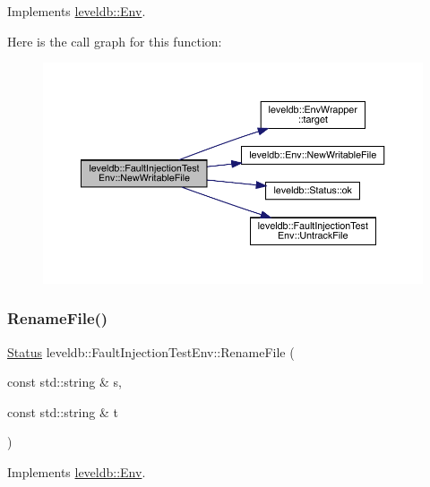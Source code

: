 Implements \mbox{\hyperlink{classleveldb_1_1_env_a4566194f3e82fede425fdb5bb355f7de}{leveldb\+::\+Env}}.

Here is the call graph for this function\+:
\nopagebreak
\begin{figure}[H]
\begin{center}
\leavevmode
\includegraphics[width=350pt]{classleveldb_1_1_fault_injection_test_env_a1e89cf48116748a2f7d8c07022eab4f7_cgraph}
\end{center}
\end{figure}
\mbox{\label{classleveldb_1_1_fault_injection_test_env_ac283e671532ee024cf22f84b95680061}} 
\subsubsection{\texorpdfstring{RenameFile()}{RenameFile()}}
{\footnotesize\ttfamily \mbox{\hyperlink{classleveldb_1_1_status}{Status}} leveldb\+::\+Fault\+Injection\+Test\+Env\+::\+Rename\+File (\begin{DoxyParamCaption}\item[{const std\+::string \&}]{s,  }\item[{const std\+::string \&}]{t }\end{DoxyParamCaption})\hspace{0.3cm}{\ttfamily [virtual]}}



Implements \mbox{\hyperlink{classleveldb_1_1_env_abd743b3d4751ada1ab307427827ed5b0}{leveldb\+::\+Env}}.

